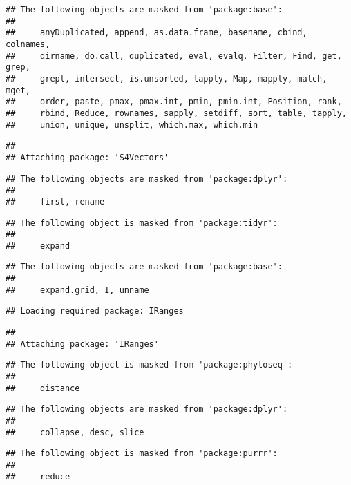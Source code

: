 \documentclass[
]{article}
\begin{document}
\begin{verbatim}
## The following objects are masked from 'package:base':
## 
##     anyDuplicated, append, as.data.frame, basename, cbind, colnames,
##     dirname, do.call, duplicated, eval, evalq, Filter, Find, get, grep,
##     grepl, intersect, is.unsorted, lapply, Map, mapply, match, mget,
##     order, paste, pmax, pmax.int, pmin, pmin.int, Position, rank,
##     rbind, Reduce, rownames, sapply, setdiff, sort, table, tapply,
##     union, unique, unsplit, which.max, which.min
\end{verbatim}

\begin{verbatim}
## 
## Attaching package: 'S4Vectors'
\end{verbatim}

\begin{verbatim}
## The following objects are masked from 'package:dplyr':
## 
##     first, rename
\end{verbatim}

\begin{verbatim}
## The following object is masked from 'package:tidyr':
## 
##     expand
\end{verbatim}

\begin{verbatim}
## The following objects are masked from 'package:base':
## 
##     expand.grid, I, unname
\end{verbatim}

\begin{verbatim}
## Loading required package: IRanges
\end{verbatim}

\begin{verbatim}
## 
## Attaching package: 'IRanges'
\end{verbatim}

\begin{verbatim}
## The following object is masked from 'package:phyloseq':
## 
##     distance
\end{verbatim}

\begin{verbatim}
## The following objects are masked from 'package:dplyr':
## 
##     collapse, desc, slice
\end{verbatim}

\begin{verbatim}
## The following object is masked from 'package:purrr':
## 
##     reduce
\end{verbatim}
\end{document}
